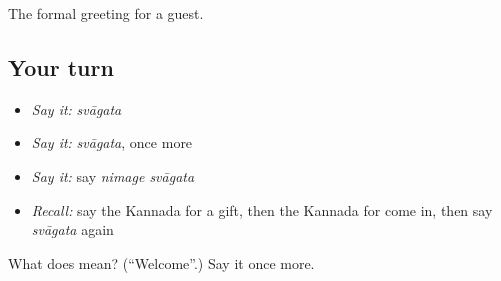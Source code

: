 \begin{grammarlens}[title={What you've built}]
The formal greeting for a guest.
\end{grammarlens}

\subsection*{Your turn}
\begin{itemize}
\raggedright
  \item \emph{Say it:} \emph{svāgata}
  \item \emph{Say it:} \emph{svāgata}, once more
  \item \emph{Say it:} say \emph{nimage svāgata}
  \item \emph{Recall:} say the Kannada for a gift, then the Kannada for come in, then say \emph{svāgata} again
\end{itemize}

\begin{tcolorbox}[breakable,colback=teal!4,colframe=teal!35!black,title={Before you move on}]
What does  mean? (\textquotedblleft{}Welcome\textquotedblright{}.) Say it once more.
\end{tcolorbox}
